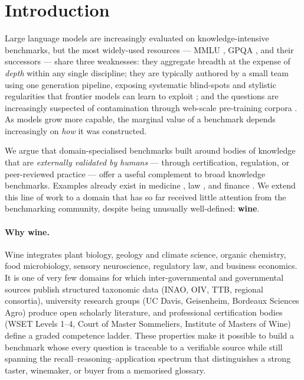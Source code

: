 \section{Introduction}
\label{sec:intro}

Large language models are increasingly evaluated on knowledge-intensive
benchmarks, but the most widely-used resources --- MMLU
\citep{hendrycks2021mmlu}, GPQA \citep{rein2024gpqa}, and their
successors \citep{srivastava2023bigbench, zhong2024agieval, phan2025hle}
--- share three weaknesses: they aggregate breadth at the expense of
\emph{depth} within any single discipline; they are typically authored
by a small team using one generation pipeline, exposing systematic
blind-spots and stylistic regularities that frontier models can learn
to exploit \citep{panickssery2024selfpref, zheng2023judging}; and the
questions are increasingly suspected of contamination through web-scale
pre-training corpora \citep{sainz2023contamination,
magar2022contamination, dodge2021documenting}. As models grow more
capable, the marginal value of a benchmark depends increasingly on
\emph{how} it was constructed.

We argue that domain-specialised benchmarks built around bodies of
knowledge that are \emph{externally validated by humans} --- through
certification, regulation, or peer-reviewed practice --- offer a useful
complement to broad knowledge benchmarks. Examples already exist in
medicine \citep{jin2021medqa, jin2019pubmedqa}, law
\citep{guha2023legalbench}, and finance \citep{islam2023financebench}. We
extend this line of work to a domain that has so far received little
attention from the benchmarking community, despite being unusually
well-defined: \textbf{wine}.

\paragraph{Why wine.} Wine integrates plant biology, geology and
climate science, organic chemistry, food microbiology, sensory
neuroscience, regulatory law, and business economics. It is one of
very few domains for which inter-governmental and governmental sources
publish structured taxonomic data (INAO, OIV, TTB, regional consortia),
university research groups (UC Davis, Geisenheim, Bordeaux Sciences
Agro) produce open scholarly literature, and professional certification
bodies (WSET Levels 1--4, Court of Master Sommeliers, Institute of
Masters of Wine) define a graded competence ladder. These properties
make it possible to build a benchmark whose every question is
traceable to a verifiable source while still spanning the
recall--reasoning--application spectrum that distinguishes a strong
taster, winemaker, or buyer from a memorised glossary.

